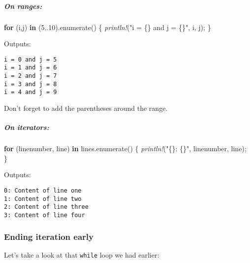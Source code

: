 \documentclass[a4paper,]{book}
\newenvironment{Shaded}{\begin{snugshade}}{\end{snugshade}}
\newcommand{\KeywordTok}[1]{\textcolor[rgb]{0.13,0.29,0.53}{\textbf{{#1}}}}
\newcommand{\DecValTok}[1]{\textcolor[rgb]{0.00,0.00,0.81}{{#1}}}
\newcommand{\ConstantTok}[1]{\textcolor[rgb]{0.00,0.00,0.00}{{#1}}}
\newcommand{\StringTok}[1]{\textcolor[rgb]{0.31,0.60,0.02}{{#1}}}
\newcommand{\PreprocessorTok}[1]{\textcolor[rgb]{0.56,0.35,0.01}{\textit{{#1}}}}
\newcommand{\NormalTok}[1]{{#1}}
\let\oldsubparagraph\subparagraph
\renewcommand{\subparagraph}[1]{\oldsubparagraph{#1}\mbox{}}
\begin{document}
\subparagraph{On ranges:}\label{on-ranges}

\begin{Shaded}
\begin{Highlighting}[]
\KeywordTok{for} \NormalTok{(i,j) }\KeywordTok{in} \NormalTok{(}\DecValTok{5.}\NormalTok{.}\DecValTok{10}\NormalTok{).enumerate() \{}
    \PreprocessorTok{println!}\NormalTok{(}\StringTok{"i = \{\} and j = \{\}"}\NormalTok{, i, j);}
\NormalTok{\}}
\end{Highlighting}
\end{Shaded}

Outputs:

\begin{verbatim}
i = 0 and j = 5
i = 1 and j = 6
i = 2 and j = 7
i = 3 and j = 8
i = 4 and j = 9
\end{verbatim}

Don't forget to add the parentheses around the range.

\subparagraph{On iterators:}\label{on-iterators}

\begin{Shaded}
\begin{Highlighting}[]
\KeywordTok{for} \NormalTok{(linenumber, line) }\KeywordTok{in} \NormalTok{lines.enumerate() \{}
    \PreprocessorTok{println!}\NormalTok{(}\StringTok{"\{\}: \{\}"}\NormalTok{, linenumber, line);}
\NormalTok{\}}
\end{Highlighting}
\end{Shaded}

Outputs:

\begin{verbatim}
0: Content of line one
1: Content of line two
2: Content of line three
3: Content of line four
\end{verbatim}

\subsubsection{Ending iteration early}\label{ending-iteration-early}

Let's take a look at that \texttt{while} loop we had earlier:

\begin{Shaded}
\end{Shaded}
\end{document}
